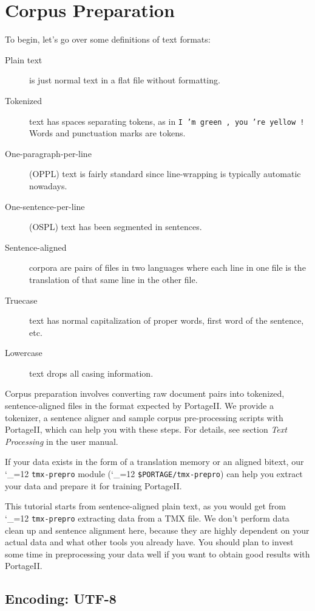 \documentclass[11pt,letterpaper]{article}
\newcommand{\PS}{PortageII\xspace}
\def\code{\begingroup\catcode`\_=12 \codex}
\newcommand{\codex}[1]{\texttt{#1}\endgroup}
\begin{document}
\section{Corpus Preparation} \label{CorpusPreparation}

To begin, let's go over some definitions of text formats:
\begin{description}
  \item[Plain text] is just normal text in a flat file without formatting.
  \item[Tokenized] text has spaces separating tokens, as in \texttt{I 'm green
  , you 're yellow !} Words and punctuation marks are tokens.
  \item[One-paragraph-per-line] (OPPL) text is fairly standard since line-wrapping is
  typically automatic nowadays.
  \item[One-sentence-per-line] (OSPL) text has been segmented in sentences.
  \item[Sentence-aligned] corpora are pairs of files in two languages where
  each line in one file is the translation of that same line in the other file.
  \item[Truecase] text has normal capitalization of proper words, first word of
  the sentence, etc.
  \item[Lowercase] text drops all casing information.
\end{description}

Corpus preparation involves converting raw document pairs into tokenized,
sentence-aligned files in the format expected by \PS.  We provide a
tokenizer, a sentence aligner and sample corpus pre-processing scripts with
\PS, which can help you with these steps.  For details, see section \emph{Text
Processing} in the user manual.

If your data exists in the form of a translation memory or an aligned bitext,
our \code{tmx-prepro} module (\code{\$PORTAGE/tmx-prepro}) can help you extract
your data and prepare it for training \PS.

This tutorial starts from sentence-aligned plain text, as you would get from
\code{tmx-prepro} extracting data from a TMX file.
We don't perform data clean up and sentence alignment here,
because they are highly dependent on your actual data and what other tools you
already have.  You should plan to invest some time in preprocessing your data
well if you want to obtain good results with \PS.

\subsection{Encoding: UTF-8}
\end{document}
